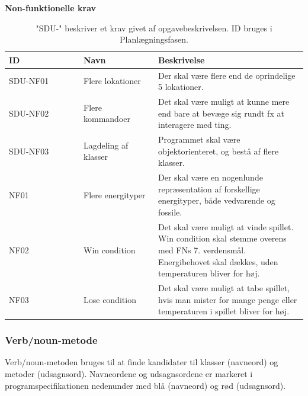 \documentclass[a4paper,12pt]{report}
\begin{document}
\textbf{Non-funktionelle krav}
\begin{table}[H]
\begin{tabular}{|p{0.25\linewidth}|p{0.25\linewidth}||p{0.5\linewidth}|}
\hline
\textbf{ID} & \textbf{Navn}        & \textbf{Beskrivelse}                                                                                                                                         \\ \hline
SDU-NF01    & Flere lokationer     & Der skal være flere end de oprindelige 5 lokationer.                                                                                                         \\ \hline
SDU-NF02    & Flere kommandoer     & Det skal være muligt at kunne mere end bare at bevæge sig rundt fx at interagere med ting.                                                                   \\ \hline
SDU-NF03    & Lagdeling af klasser & Programmet skal være objektorienteret, og bestå af flere klasser.                                                                                            \\ \hline
NF01        & Flere energityper    & Der skal være en nogenlunde repræsentation af forskellige energityper, både vedvarende og fossile.                                                           \\ \hline
NF02        & Win condition        & Det skal være muligt at vinde spillet. Win condition skal stemme overens med FNs 7. verdensmål. Energibehovet skal dækkes, uden temperaturen bliver for høj. \\ \hline
NF03        & Lose condition       & Det skal være muligt at tabe spillet, hvis man mister for mange penge eller temperaturen i spillet bliver for høj.                                           \\ \hline
\end{tabular}
\caption{"SDU-" beskriver et krav givet af opgavebeskrivelsen. ID bruges i Planlægningsfasen.}
\label{tab:nfkrav}
\end{table}

\subsubsection{Verb/noun-metode}
Verb/noun-metoden bruges til at finde kandidater til klasser (navneord) og metoder (udsagnsord). Navneordene og udsagnsordene er markeret i programspecifikationen nedenunder med blå (navneord) og rød (udsagnsord). \\
\end{document}
